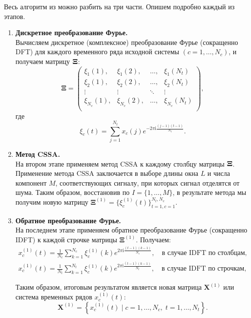\documentclass[specialist,
               substylefile = spbu.rtx,
               subf,href,colorlinks=true, 12pt]{disser}
\newcommand{\I}{\mathrm{i}}
\begin{document}
    Весь алгоритм из \cite{Trickett2003} можно разбить на три части.
    Опишем подробно каждый из этапов.

\begin{enumerate}
\item
{\bf Дискретное преобразование Фурье.\\}
    Вычисляем дискретное (комплексное) преобразование Фурье (сокращенно DFT)
    для каждого временного ряда исходной системы $(c=1, \ldots, N_c)$,
    и получаем матрицу $\bf\Xi$:
\begin{equation*}
\mathbf\Xi =
\left(
\begin{array}{cccc}
    \xi_1(1), & \xi_1(2), & \ldots, & \xi_1(N_t)\\
    \xi_2(1), & \xi_2(2), & \ldots, & \xi_2(N_t)\\
    \vdots & \vdots & \ddots & \vdots\\
    \xi_{N_c}(1), & \xi_{N_c}(2), & \ldots, & \xi_{N_c}(N_t)\\
\end{array}
\right),
\end{equation*}
   где
\begin{equation*}
    \xi_c(t) = \sum_{j=1}^{N_t}x_c(j)e^{-2\pi \I \frac{(j-1)(t-1)}{N_t}}.
\end{equation*}

\item
{\bf Метод CSSA.\\}
На втором этапе применяем метод CSSA
 к каждому столбцу матрицы $\bf\Xi$.
Применение метода CSSA заключается в выборе длины окна $L$ и числа компонент $M$, соответствующих сигналу,  при которых сигнал отделятся от шума.
Таким образом, восстановив по $I = \{1,\ldots,M\}$, в результате метода мы получим новую матрицу $\mathbf{\Xi}^{(1)} = \{\xi^{(1)}_c(t)\}_{t=1, c=1}^{N_t, N_c}$.

\item
{\bf Обратное преобразование Фурье.\\}
На последнем этапе применяем обратное преобразование Фурье (сокращенно IDFT)
к каждой строчке матрицы $\mathbf{\Xi}^{(1)}$.
Получаем:
\begin{gather*}
     x_c^{(1)}(t) = \frac{1}{N_c}\sum_{k=1}^{N_c}\xi_c^{(1)}(k)e^{2\pi \I \frac{(t-1)(k-1)}{N_c}},
    \quad \text{в случае IDFT по столбцам}, \\
     x_c^{(1)}(t) = \frac{1}{N_t}\sum_{k=1}^{N_t}\xi_c^{(1)}(k)e^{2\pi \I \frac{(t-1)(k-1)}{N_t}},
    \quad \text{в случае IDFT по строчкам},
\end{gather*}

Таким образом, итоговым результатом является новая матрица $\mathbf{X}^{(1)}$ или система временных рядов $x_c^{(1)}(t)$:
\begin{equation*}
    \mathbf{X}^{(1)}=\left\{x_c^{(1)}(t) \; | \; c=1, \ldots, N_c, \; t=1, \ldots, N_t\right\}.
\end{equation*}
\end{enumerate}
\end{document}
